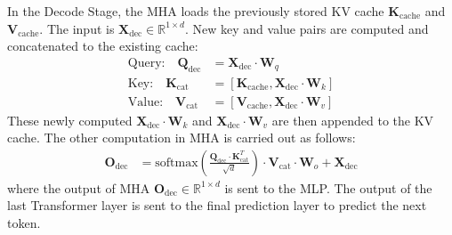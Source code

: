 In the Decode Stage, the MHA loads the previously stored KV cache $\mathbf{K}_{\text{cache}}$ and $\mathbf{V}_{\text{cache}}$. The input is $\mathbf{X}_{\text{dec}} \in \mathbb{R}^{1\times d}$. New key and value pairs are computed and concatenated to the existing cache:
\begin{align*}
\text{Query:} \quad \mathbf{Q}_{\text{dec}} &=  \mathbf{X}_{\text{dec}} \cdot \mathbf{W}_q \\
\text{Key:} \quad \mathbf{K}_{\text{cat}} &=  [\mathbf{K}_{\text{cache}}, \mathbf{X}_{\text{dec}} \cdot \mathbf{W}_k] \\
\text{Value:} \quad \mathbf{V}_{\text{cat}} &=  [\mathbf{V}_{\text{cache}}, \mathbf{X}_{\text{dec}} \cdot \mathbf{W}_v]
\end{align*}
These newly computed $\mathbf{X}_{\text{dec}} \cdot \mathbf{W}_k$ and $\mathbf{X}_{\text{dec}} \cdot \mathbf{W}_v$ are then appended to the KV cache. The other computation in MHA is carried out as follows:
\begin{align*}
\mathbf{O}_{\text{dec}} &= \text{softmax}\left(\frac{\mathbf{Q}_{\text{dec}} \cdot \mathbf{K}_{\text{cat}}^T}{\sqrt{d}}\right) \cdot \mathbf{V}_{\text{cat}} \cdot \mathbf{W}_o + \mathbf{X}_{\text{dec}}
\end{align*}
where the output of MHA $\mathbf{O}_{\text{dec}} \in \mathbb{R}^{1\times d}$ is sent to the MLP.
The output of the last Transformer layer is sent to the final prediction layer to predict the next token.







